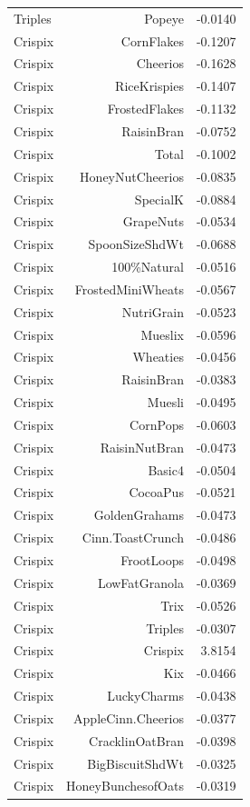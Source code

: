 \begin{longtable}{@{}lrr@{}}
Triples & Popeye & -0.0140 \\
Crispix & CornFlakes & -0.1207 \\
Crispix & Cheerios & -0.1628 \\
Crispix & RiceKrispies & -0.1407 \\
Crispix & FrostedFlakes & -0.1132 \\
Crispix & RaisinBran & -0.0752 \\
Crispix & Total & -0.1002 \\
Crispix & HoneyNutCheerios & -0.0835 \\
Crispix & SpecialK & -0.0884 \\
Crispix & GrapeNuts & -0.0534 \\
Crispix & SpoonSizeShdWt & -0.0688 \\
Crispix & 100\%Natural & -0.0516 \\
Crispix & FrostedMiniWheats & -0.0567 \\
Crispix & NutriGrain & -0.0523 \\
Crispix & Mueslix & -0.0596 \\
Crispix & Wheaties & -0.0456 \\
Crispix & RaisinBran & -0.0383 \\
Crispix & Muesli & -0.0495 \\
Crispix & CornPops & -0.0603 \\
Crispix & RaisinNutBran & -0.0473 \\
Crispix & Basic4 & -0.0504 \\
Crispix & CocoaPus & -0.0521 \\
Crispix & GoldenGrahams & -0.0473 \\
Crispix & Cinn.ToastCrunch & -0.0486 \\
Crispix & FrootLoops & -0.0498 \\
Crispix & LowFatGranola & -0.0369 \\
Crispix & Trix & -0.0526 \\
Crispix & Triples & -0.0307 \\
Crispix & Crispix & 3.8154 \\
Crispix & Kix & -0.0466 \\
Crispix & LuckyCharms & -0.0438 \\
Crispix & AppleCinn.Cheerios & -0.0377 \\
Crispix & CracklinOatBran & -0.0398 \\
Crispix & BigBiscuitShdWt & -0.0325 \\
Crispix & HoneyBunchesofOats & -0.0319 \\

\end{longtable}
